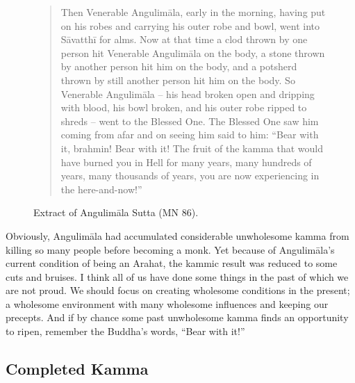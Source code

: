 \begin{figure}[H]
\begin{quotation}
Then Venerable Angulimāla, early in the morning, having put on his robes and carrying his outer robe and bowl, went into Sāvatthī for alms. Now at that time a clod thrown by one person hit Venerable Angulimāla on the body, a stone thrown by another person hit him on the body, and a potsherd thrown by still another person hit him on the body. So Venerable Angulimāla – his head broken open and dripping with blood, his bowl broken, and his outer robe ripped to shreds – went to the Blessed One. The Blessed One saw him coming from afar and on seeing him said to him: “Bear with it, brahmin! Bear with it! The fruit of the kamma that would have burned you in Hell for many years, many hundreds of years, many thousands of years, you are now experiencing in the here-and-now!”
\end{quotation}
\caption{Extract of Angulimāla Sutta (MN 86).}
\label{fig:MN86}
\end{figure}

Obviously, Angulimāla had accumulated considerable unwholesome kamma from killing so many people before becoming a monk. Yet because of Angulimāla’s current condition of being an Arahat, the kammic result was reduced to some cuts and bruises. I think all of us have done some things in the past of which we are not proud. We should focus on creating wholesome conditions in the present; a wholesome environment with many wholesome influences and keeping our precepts. And if by chance some past unwholesome kamma finds an opportunity to ripen, remember the Buddha’s words, “Bear with it!”

\subsection*{Completed Kamma}

